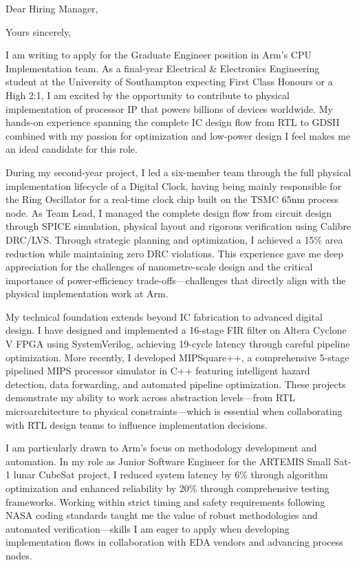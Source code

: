 \documentclass[11pt,a4paper,sans]{moderncv}
\begin{document}
\date{\today}
\opening{Dear Hiring Manager,}
\closing{Yours sincerely,}

\makelettertitle

I am writing to apply for the Graduate Engineer position in Arm's CPU Implementation team. As a final-year Electrical \& Electronics Engineering student at the University of Southampton expecting First Class Honours or a High 2:1, I am excited by the opportunity to contribute to physical implementation of processor IP that powers billions of devices worldwide. My hands-on experience spanning the complete IC design flow from RTL to GDSII combined with my passion for optimization and low-power design I feel makes me an ideal candidate for this role.

During my second-year project, I led a six-member team through the full physical implementation lifecycle of a Digital Clock, having being mainly responsible for the Ring Oscillator for a real-time clock chip built on the TSMC 65nm process node. As Team Lead, I managed the complete design flow from circuit design through SPICE simulation, physical layout and rigorous verification using Calibre DRC/LVS. Through strategic planning and optimization, I achieved a 15\% area reduction while maintaining zero DRC violations. This experience gave me deep appreciation for the challenges of nanometre-scale design and the critical importance of power-efficiency trade-offs—challenges that directly align with the physical implementation work at Arm.

My technical foundation extends beyond IC fabrication to advanced digital design. I have designed and implemented a 16-stage FIR filter on Altera Cyclone V FPGA using SystemVerilog, achieving 19-cycle latency through careful pipeline optimization. More recently, I developed MIPSquare++, a comprehensive 5-stage pipelined MIPS processor simulator in C++ featuring intelligent hazard detection, data forwarding, and automated pipeline optimization. These projects demonstrate my ability to work across abstraction levels—from RTL microarchitecture to physical constraints—which is essential when collaborating with RTL design teams to influence implementation decisions.

I am particularly drawn to Arm's focus on methodology development and automation. In my role as Junior Software Engineer for the ARTEMIS Small Sat-1 lunar CubeSat project, I reduced system latency by 6\% through algorithm optimization and enhanced reliability by 20\% through comprehensive testing frameworks. Working within strict timing and safety requirements following NASA coding standards taught me the value of robust methodologies and automated verification—skills I am eager to apply when developing implementation flows in collaboration with EDA vendors and advancing process nodes.
\end{document}
